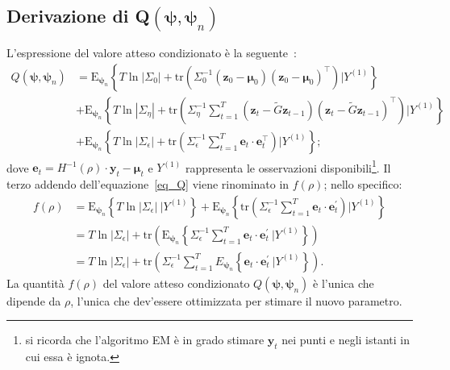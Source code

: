 \subsection[Derivazione di Q$(\boldsymbol{\psi}, \boldsymbol{\psi}_n)$]{Derivazione di Q$(\boldsymbol{\psi}, \boldsymbol{\psi}_n)$}
L'espressione del valore atteso condizionato è la seguente~\cite{paper_GRASPA}:
\begin{equation}
	\begin{split}
		Q(\boldsymbol{\psi},\boldsymbol{\psi}_n) & = \text{E}_{\boldsymbol{\psi}_n}\left\{T\ln|\Sigma_0| + \text{tr}\left(\Sigma_0^{-1}\left(\mathbf{z}_0 - \boldsymbol{\mu}_0\right)\left(\mathbf{z}_0 - \boldsymbol{\mu}_0\right)^\top\right)\bigg| Y^{(1)}\right\} \\
		& + \text{E}_{\boldsymbol{\psi}_n}\left\{T\ln|\Sigma_\eta| + \text{tr}\left(\Sigma_\eta^{-1}\sum_{t=1}^{T}\left(\mathbf{z}_t - \tilde{G}\mathbf{z}_{t-1}\right)\left(\mathbf{z}_t - \tilde{G}\mathbf{z}_{t-1}\right)^\top\right)\bigg| Y^{(1)}\right\} \\
		& + \text{E}_{\boldsymbol{\psi}_n}\left\{T\ln|\Sigma_\epsilon| + \text{tr}\left(\Sigma_\epsilon^{-1}\sum_{t=1}^{T}\mathbf{e}_t\cdot\mathbf{e}_t^\top\right)\bigg| Y^{(1)}\right\};
	\end{split}
	\label{eq_Q}
\end{equation}
dove $\mathbf{e}_t = H^{-1}(\rho)\cdot\mathbf{y}_t - \boldsymbol{\mu}_t$ e $Y^{(1)}$ rappresenta le osservazioni disponibili\footnote{si ricorda che l'algoritmo EM è in grado stimare $\mathbf{y}_t$ nei punti e negli istanti in cui essa è ignota.}. Il terzo addendo dell'equazione~\ref{eq_Q} viene rinominato in $f(\rho)$; nello specifico:
\begin{equation}
	\begin{split}
		f(\rho) & = \text{E}_{\boldsymbol{\psi}_n}\left\{T\ln|\Sigma_\epsilon| \ \bigg|Y^{(1)}\right\} + \text{E}_{\boldsymbol{\psi}_n}\left\{\text{tr}\left(\Sigma_\epsilon^{-1}\sum_{t=1}^{T}\mathbf{e}_t\cdot\mathbf{e}_t^\prime\right)\bigg|Y^{(1)}\right\} \\
		& = T\ln|\Sigma_\epsilon| + \text{tr}\left(\text{E}_{\boldsymbol{\psi}_n}\left\{\Sigma_\epsilon^{-1}\sum_{t=1}^{T}\mathbf{e}_t\cdot\mathbf{e}_t^\prime \ \bigg|Y^{(1)}\right\}\right) \\
		& = T\ln|\Sigma_\epsilon| + \text{tr}\left(\Sigma_\epsilon^{-1}\sum_{t=1}^{T}E_{\boldsymbol{\psi}_n}\left\{\mathbf{e}_t\cdot\mathbf{e}_t^\prime \ \bigg| Y^{(1)}\right\}\right).
	\end{split}
\end{equation}
La quantità $f(\rho)$ del valore atteso condizionato $Q(\boldsymbol{\psi}, \boldsymbol{\psi}_n)$ è l'unica che dipende da $\rho$, l'unica che dev'essere ottimizzata per stimare il nuovo parametro.

